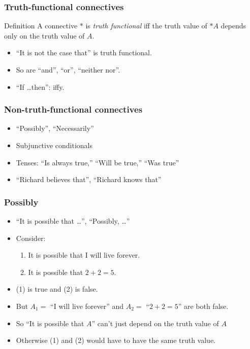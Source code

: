 \begin{frame}
\frametitle{Truth-functional connectives}

\begin{block}{Definition}
  A connective $*$ is \emph{truth functional} iff the truth value of $*A$ depends only on the truth value of $A$.
\end{block}

\begin{itemize}[<+->]
  \item ``It is not the case that'' is truth functional.
  \item So are ``and'', ``or'', ``neither nor''.
  \item ``If \dots then'': iffy.
\end{itemize}

\end{frame}


\begin{frame}
  \frametitle{Non-truth-functional connectives}
  
  \begin{itemize}
    \item ``Possibly'', ``Necessarily''
    \item Subjunctive conditionals
    \item Tenses: ``Is always true,'' ``Will be true,'' ``Was true''
    \item ``Richard believes that'', ``Richard knows that''
  \end{itemize}
  \end{frame}
  
\begin{frame}
\frametitle{Possibly}

  \begin{itemize}[<+->]
    \item ``It is possible that \dots'', ``Possibly, \dots''
    \item Consider:
      \begin{enumerate}[<+->]
        \item It is possible that I will live forever.
        \item It is possible that $2+2=5$.
      \end{enumerate}
    \item (1) is true and (2) is false.
    \item But $A_1=$ ``I will live forever'' and
    $A_2=$ ``$2+2=5$'' are both false.
    \item So ``It is possible that $A$'' can't just depend on the
    truth value of $A$
    \item Otherwise (1) and (2) would have to have the same truth value.
  \end{itemize}

\end{frame}

